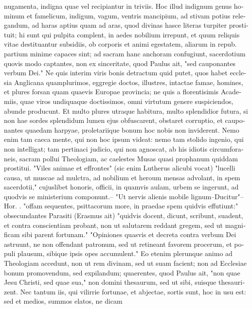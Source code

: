 \begin{latin}
nugamenta, indigna quae vel recipiantur in triviis. Hoc illud indignum genus
hominum et famelicum, indigum, vagum, ventris mancipium, ad stivam potius
relegandum, ad haras aptius quam ad aras, quod divinas hasce literas turpiter
prostituit; hi sunt qui pulpita complent, in aedes nobilium irrepunt, et quum
reliquis vitae destituantur subsidiis, ob corporis et animi egestatem,
aliarum in repub. partium minime capaces sint; ad sacram hanc anchoram
confugiunt, sacerdotium quovis modo captantes, non ex sinceritate, quod
Paulus ait, "sed cauponantes verbum Dei." Ne quis
interim viris bonis detractum quid putet, quos habet ecclesia Anglicana
quamplurimos, eggregie doctos, illustres, intactae famae, homines, et plures
forsan quam quaevis Europae provincia; ne quis a florentisimis Academiis,
quae viros undiquaque doctissimos, omni virtutum genere suspiciendos, abunde
producunt. Et multo plures utraque habitura, multo splendidior futura, si non
hae sordes splendidum lumen ejus obfuscarent, obstaret corruptio, et
cauponantes quaedam harpyae, proletariique bonum hoc nobis non inviderent.
Nemo enim tam caeca mente, qui non hoc ipsum videat: nemo tam stolido
ingenio, qui non intelligat; tam pertinaci judicio, qui non agnoscat, ab his
idiotis circumforaneis, sacram pollui Theologiam, ac caelestes Musas quasi
prophanum quiddam prostitui. "Viles animae et effrontes" (sic enim Lutherus
alicubi vocat) "lucelli causa, ut muscae ad mulctra, ad
nobilium et heroum mensas advolant, in spem sacerdotii," cujuslibet honoris,
officii, in quamvis aulam, urbem se ingerunt, ad quodvis se ministerium
componunt.-- "Ut nervis alienis mobile lignum--Ducitur"--Hor.
. "offam
sequentes, psittacorum more, in praedae spem quidvis effutiunt:"
obsecundantes Parasiti (Erasmus ait) "quidvis docent,
dicunt, scribunt, suadent, et contra conscientiam probant, non ut salutarem
reddant gregem, sed ut magnificam sibi parent fortunam."
"Opiniones quasvis et decreta contra verbum Dei
astruunt, ne non offendant patronum, sed ut retineant favorem procerum, et
populi plausum, sibique ipsis opes accumulent." Eo etenim plerunque animo ad
Theologiam accedunt, non ut rem divinam, sed ut suam facient; non ad
Ecclesiae bonum promovendum, sed expilandum; quaerentes, quod Paulus ait,
"non quae Jesu Christi, sed quae sua," non domini thesaurum, sed ut sibi,
suisque thesaurizent. Nec tantum iis, qui vilirrie fortunae, et abjectae,
sortis sunt, hoc in usu est: sed et medios, summos elatos, ne dicam

\end{latin}
